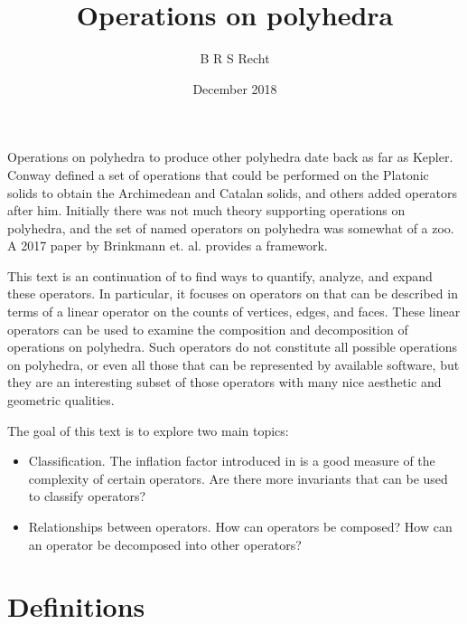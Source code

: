 \documentclass{amsart}[12pt]
\title{Operations on polyhedra}
\author{B R S Recht}
\date{December 2018}
\begin{document}
\maketitle

Operations on polyhedra to produce other polyhedra date back as far as Kepler.
Conway defined a set of operations that could be performed on the Platonic
solids to obtain the Archimedean and Catalan solids, and others added operators
after him. Initially there was not much theory supporting operations on
polyhedra, and the set of named operators on polyhedra was somewhat of a zoo. A 2017 paper by Brinkmann et. al. provides a framework. \cite{brinkmann}

This text is an continuation of \cite{brinkmann} to find ways to quantify,
analyze, and expand these operators. In particular, it focuses on operators on
that can be described in terms of a linear operator on the counts of vertices,
edges, and faces. These linear operators can be used to examine the composition
and decomposition of operations on polyhedra. Such operators do not constitute
all possible operations on polyhedra, or even all those that can be represented
by available software, but they are an interesting subset of those
operators with many nice aesthetic and geometric qualities.

The goal of this text is to explore two main topics:
\begin{itemize}
  \item Classification. The inflation factor introduced in \cite{brinkmann} is a good measure of the complexity of certain operators.
  Are there more invariants that can be used to classify operators?
  \item Relationships between operators. How can operators be composed? How can
  an operator be decomposed into other operators?
\end{itemize}

\section{Definitions}
\end{document}
